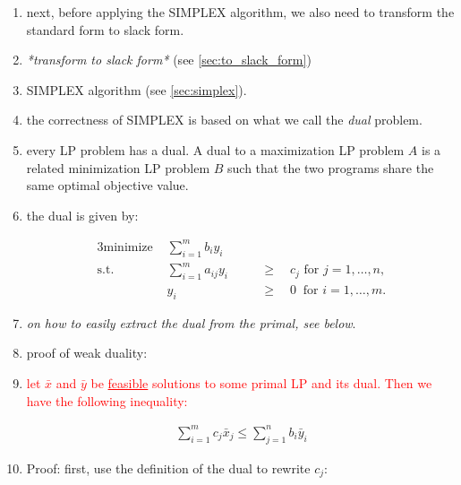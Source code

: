 \begin{enumerate}
  \item next, before applying the SIMPLEX algorithm, we also need to transform
    the standard form to slack form.

  \item \emph{*transform to slack form*} (see \cref{sec:to_slack_form})

  \item SIMPLEX algorithm (see \cref{sec:simplex}).

  \item the correctness of SIMPLEX is based on what we call the \emph{dual}
    problem.

  \item every LP problem has a dual. A dual to a maximization LP problem $A$ is
    a related minimization LP problem $B$ such that the two programs share the
    same optimal objective value.

  \item the dual is given by:

    \begin{textred}
    \begin{alignat*}{3}
      \text{minimize } & \sum_{i = 1}^m b_i y_i&&\\
      \text{s.t. }     & \sum_{i = 1}^m a_{ij}y_i \quad&& \geq \quad c_j   \text{ for } j = 1,\dots,n,\\
                       &                      y_i \quad&& \geq \quad 0   \ \text{ for } i = 1,\dots,m.
    \end{alignat*}
    \end{textred}

  \item \emph{on how to easily extract the dual from the primal, see below}.

  \item proof of weak duality:

    \newcommand{\x}{\bar x}
    \newcommand{\y}{\bar y}

  \item \textcolor{red}{let $\x$ and $\y$ be \underline{feasible} solutions to some primal LP
    and its dual. Then we have the following inequality:}

    \begin{textred}
    \begin{align}
      \sum_{i = 1}^m c_j \x_j \leq \sum_{j = 1}^n b_i\y_i
    \end{align}
    \end{textred}

  \item Proof: first, use the definition of the dual to rewrite $c_j$:


\end{enumerate}

